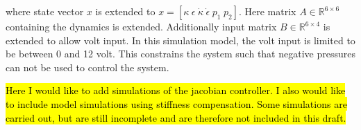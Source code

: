 where state vector $x$ is extended to $x = [\kappa \hspace{3pt} \epsilon \hspace{3pt} \dot{\kappa} \hspace{3pt} \dot{\epsilon} \hspace{3pt} p_1 \hspace{3pt} p_2]$. Here matrix $A \in \mathbb{R}^{6\times 6}$ containing the dynamics is extended. Additionally input matrix $B \in \mathbb{R}^{6\times 4}$ is extended to allow volt input. In this simulation model, the volt input is limited to be between 0 and 12 volt. This constrains the system such that negative pressures can not be used to control the system. 

\hl{Here I would like to add simulations of the jacobian controller. I also would like to include model simulations using stiffness compensation. Some simulations are carried out, but are still incomplete and are therefore not included in this draft.}



































